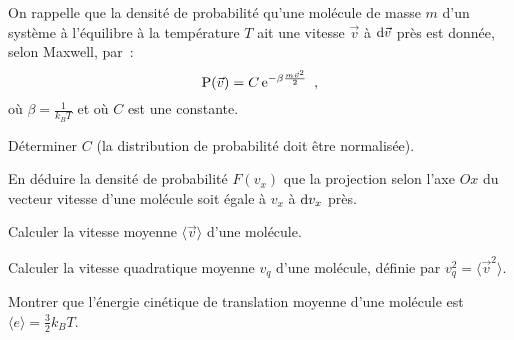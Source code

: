 On rappelle que la densité de probabilité qu'une molécule de masse $m$
d'un système à l'équilibre à la température $T$ ait une vitesse $\vec v$ à ${\rm d} {\vec v}$ près est donnée, selon
Maxwell, par~:
\begin{equation*}
\text{P}(\vec v) = C \,{\rm e}^{-\beta \frac{m\vec v^2}{2}}\enspace,
\end{equation*}
où $\beta=\frac{1}{k_B T}$ et où $C$ est une constante.

\medskip

\question
Déterminer $C$ (la distribution de probabilité doit être normalisée).

\question
En déduire la densité de probabilité $F(v_x)$ que la projection selon l'axe $Ox$ du vecteur vitesse d'une molécule soit égale à $v_x$ à ${\rm d}v_x$ près.\label{theocine2}

\question
Calculer la vitesse moyenne $\langle \vec v\rangle$ d'une molécule.

\question
Calculer la vitesse quadratique moyenne $v_q$ d'une molécule, définie par $v_q^2=\langle {\vec v^2}\rangle$.

\question
Montrer que l'énergie cinétique de translation moyenne d'une molécule est $\langle e \rangle = \frac32 k_B T$.
